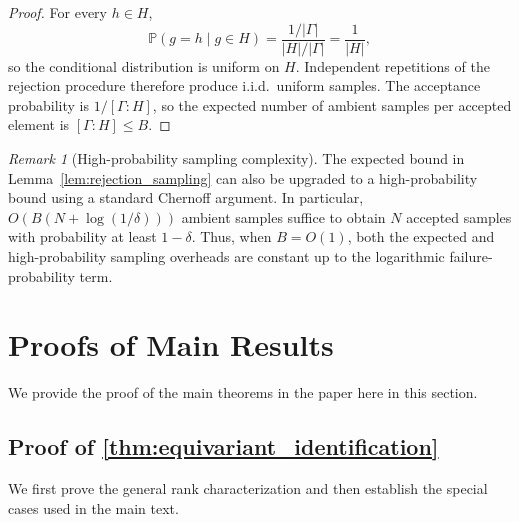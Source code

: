 \documentclass[11pt]{article}
\theoremstyle{plain}
\theoremstyle{definition}
\theoremstyle{remark}
\newtheorem{remark}[theorem]{Remark}
\begin{document}
\begin{proof}
For every \(h\in H\),
\[
\mathbb P(g=h\mid g\in H)
=
\frac{1/|\Gamma|}{|H|/|\Gamma|}
=
\frac1{|H|},
\]
so the conditional distribution is uniform on \(H\). Independent repetitions
of the rejection procedure therefore produce i.i.d.\ uniform samples. The
acceptance probability is \(1/[\Gamma:H]\), so the expected number of ambient
samples per accepted element is \([\Gamma:H]\le B\).
\end{proof}

\begin{remark}[High-probability sampling complexity]
The expected bound in Lemma~\ref{lem:rejection_sampling} can also be upgraded to
a high-probability bound using a standard Chernoff argument. In particular,
\(O(B(N+\log(1/\delta)))\) ambient samples suffice to obtain \(N\) accepted
samples with probability at least \(1-\delta\). Thus, when \(B=O(1)\), both
the expected and high-probability sampling overheads are constant up to the
logarithmic failure-probability term.
\end{remark}

 
\section{Proofs of Main Results}
We provide the proof of the main theorems in the paper here in this section.

 
\subsection{Proof of \cref{thm:equivariant_identification}}
\label{app:proof_identification}

We first prove the general rank characterization and then establish the
special cases used in the main text.
\end{document}
